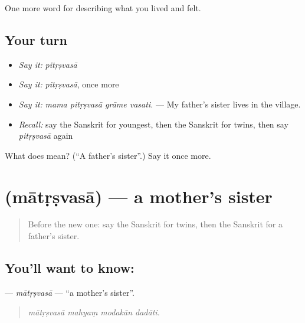 \begin{grammarlens}[title={What you've built}]
One more word for describing what you lived and felt.
\end{grammarlens}

\subsection*{Your turn}
\begin{itemize}
\raggedright
  \item \emph{Say it:} \emph{pitṛṣvasā}
  \item \emph{Say it:} \emph{pitṛṣvasā}, once more
  \item \emph{Say it:} \emph{mama pitṛṣvasā grāme vasati.} — My father's sister lives in the village.
  \item \emph{Recall:} say the Sanskrit for youngest, then the Sanskrit for twins, then say \emph{pitṛṣvasā} again
\end{itemize}

\begin{tcolorbox}[breakable,colback=teal!4,colframe=teal!35!black,title={Before you move on}]
What does  mean? (\textquotedblleft{}A father's sister\textquotedblright{}.) Say it once more.
\end{tcolorbox}
\section[\texorpdfstring{\sk{मातृष्वसा} (mātṛṣvasā)}{मातृष्वसा (mātṛṣvasā)}]{ (mātṛṣvasā) — a mother's sister}

\label{lesson:SA-C499-matrsvasa}



\begin{quote}
Before the new one: say the Sanskrit for twins, then the Sanskrit for a father's sister.
\end{quote}

\subsection*{You'll want to know: }
\textbf{} — \emph{mātṛṣvasā} — \textquotedblleft{}a mother's sister\textquotedblright{}.

\begin{quote}
   
\end{quote}

\begin{quote}
\emph{mātṛṣvasā mahyaṃ modakān dadāti.}
\end{quote}

